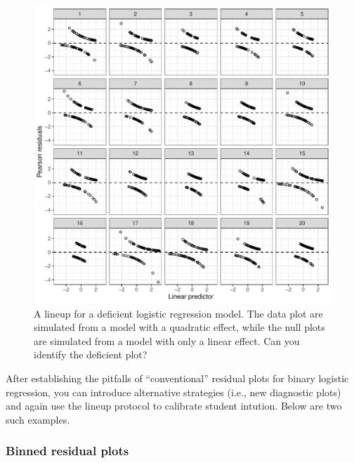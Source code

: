 \documentclass[12pt]{article}
\begin{document}
\begin{figure}
\centering
\includegraphics{figs/logistic_residuals_bad.pdf}
\caption{\label{fig:logisticissue} A lineup for a deficient logistic
regression model. The data plot are simulated from a model with a
quadratic effect, while the null plots are simulated from a model with
only a linear effect. Can you identify the deficient plot?}
\end{figure}

After establishing the pitfalls of ``conventional'' residual plots for
binary logistic regression, you can introduce alternative strategies
(i.e., new diagnostic plots) and again use the lineup protocol to
calibrate student intution. Below are two such examples.

\hypertarget{binned-residual-plots}{%
\subsubsection{Binned residual plots}\label{binned-residual-plots}}
\end{document}
